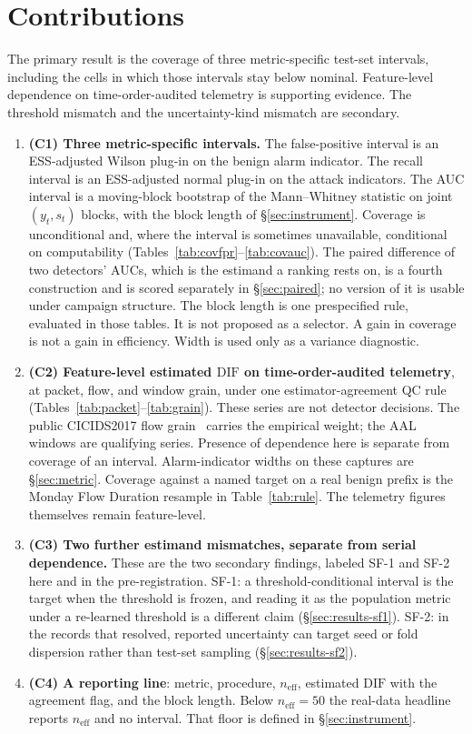 \documentclass[a4paper,fleqn]{cas-dc}
\newcommand{\DIF}{\mathrm{DIF}}
\newcommand{\neff}{n_{\mathrm{eff}}}
\begin{document}
\section{Contributions}\label{sec:objective}
The primary result is the coverage of three metric-specific test-set intervals, including the
cells in which those intervals stay below nominal. Feature-level dependence on time-order-audited
telemetry is supporting evidence. The threshold mismatch and the uncertainty-kind mismatch are
secondary.
\begin{enumerate}
\item \textbf{(C1) Three metric-specific intervals.} The false-positive interval is an ESS-adjusted
Wilson plug-in on the benign alarm indicator. The recall interval is an ESS-adjusted normal
plug-in on the attack indicators. The AUC interval is a moving-block bootstrap of the
Mann--Whitney statistic on joint $(y_t,s_t)$ blocks, with the block length of
\S\ref{sec:instrument}. Coverage is unconditional and, where the interval is sometimes unavailable,
conditional on computability (Tables~\ref{tab:covfpr}--\ref{tab:covauc}). The paired difference of
two detectors' AUCs, which is the estimand a ranking rests on, is a fourth construction and is
scored separately in \S\ref{sec:paired}; no version of it is usable under campaign structure. The block length is one
prespecified rule, evaluated in those tables. It is not proposed as a selector. A gain in coverage
is not a gain in efficiency. Width is used only as a variance diagnostic.
\item \textbf{(C2) Feature-level estimated $\DIF$ on time-order-audited telemetry}, at packet, flow, and
window grain, under one estimator-agreement QC rule
(Tables~\ref{tab:packet}--\ref{tab:grain}). These series are
not detector decisions. The public CICIDS2017 flow grain~\citep{sharafaldin2018cicids} carries the empirical weight; the AAL
windows are \WinQn{} qualifying series. Presence of dependence here is separate from coverage of an
interval. Alarm-indicator widths on these captures are \S\ref{sec:metric}. Coverage against a
named target on a real benign prefix is the Monday Flow Duration resample in Table~\ref{tab:rule}.
The telemetry figures themselves remain feature-level.
\item \textbf{(C3) Two further estimand mismatches, separate from serial dependence.} These are
the two secondary findings, labeled SF-1 and SF-2 here and in the pre-registration. SF-1: a
threshold-conditional interval is the target when the threshold is frozen, and reading it as the
population metric under a re-learned threshold is a different claim (\S\ref{sec:results-sf1}).
SF-2: in the records that resolved, reported uncertainty can target seed or fold dispersion rather
than test-set sampling (\S\ref{sec:results-sf2}).
\item \textbf{(C4) A reporting line}: metric, procedure, $\neff$, estimated $\DIF$ with the agreement
flag, and the block length. Below $\neff=50$ the real-data headline reports $\neff$ and no
interval. That floor is defined in \S\ref{sec:instrument}.
\end{enumerate}
\end{document}
